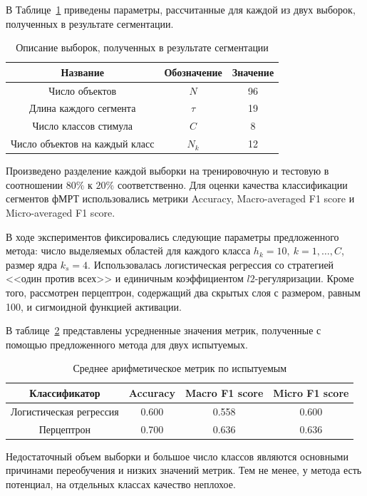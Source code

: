 В Таблице~\ref{table:sample_3} приведены параметры, рассчитанные для каждой из двух выборок, полученных в результате сегментации.
\begin{table}[h!]
	\centering
	\caption{Описание выборок, полученных в результате сегментации}
	\begin{tabular}{|c|c|c|}
		\hline
		Название                       & Обозначение & Значение             \\
		\hline \hline
		Число объектов & $N$ & 96 \\ \hline
		  Длина каждого сегмента           & $\tau$       & 19 \\ \hline
	   Число классов стимула             & $C$   & 8          \\ \hline
        Число объектов на каждый класс             & $N_k$   & 12         \\ \hline   
	\end{tabular}
	\label{table:sample_3}
\end{table} 

Произведено разделение каждой выборки на тренировочную и тестовую в соотношении $80\%$ к $20\%$ соответственно. Для оценки качества классификации сегментов фМРТ использовались метрики Accuracy, Macro-averaged F1 score и Micro-averaged F1 score.

В ходе экспериментов фиксировались следующие параметры предложенного метода: число выделяемых областей для каждого класса $h_k = 10,~k=1,\ldots, C$, размер ядра $k_s = 4$. Использовалась логистическая регрессия со стратегией <<один против всех>> и единичным коэффициентом $l2$-регуляризации. Кроме того, рассмотрен перцептрон, содержащий два скрытых слоя с размером, равным 100, и сигмоидной функцией активации.

В таблице~\ref{results} представлены усредненные значения метрик, полученные с помощью предложенного метода для двух испытуемых. 
\begin{table}[h!]
	\centering
	\caption{Среднее арифметическое метрик по испытуемым}
	\begin{tabular}{|c|c|c|c|}
		\hline
		Классификатор & Accuracy &  Macro F1 score & Micro F1 score\\
		\hline \hline
		Логистическая регрессия & 0.600 & 0.558 & 0.600\\ \hline  
          Перцептрон  & 0.700 & 0.636 & 0.636\\ \hline 
	\end{tabular}
	\label{results}
\end{table} 
Недостаточный объем выборки и большое число классов являются основными причинами переобучения и низких значений метрик. Тем не менее, у метода есть потенциал, на отдельных классах качество неплохое.

